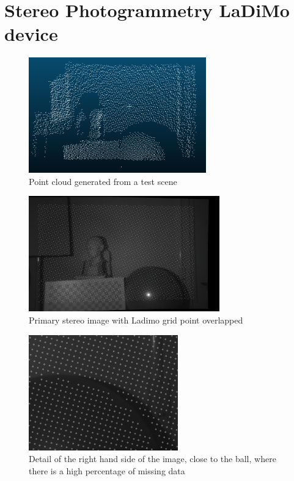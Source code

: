 \section{Stereo Photogrammetry LaDiMo device}
\label{section:stereo-device}

\begin{figure}[t]
	\begin{center}
		\includegraphics[width=.8\textwidth, height=5cm, keepaspectratio]{images/point-cloud-example.png}
		\caption{Point cloud generated from a test scene}
		\label{fig:point-cloud-input}
	\end{center}
\end{figure}

\begin{figure}[t]
	\begin{center}
		\includegraphics[width=.8\textwidth, height=5cm, keepaspectratio]{images/stereo-rectified-rgb.png}
		\caption{Primary stereo image with Ladimo grid point overlapped}
		\label{fig:primary-stereo-input}
	\end{center}
\end{figure}

\begin{figure}[t]
	\begin{center}
		\includegraphics[width=.8\textwidth, height=5cm, keepaspectratio]{images/detail-missing-data.png}
		\caption{Detail of the right hand side of the image, close to the ball, where there is a high percentage of missing data}
		\label{fig:detail-missing-data}
	\end{center}
\end{figure}

